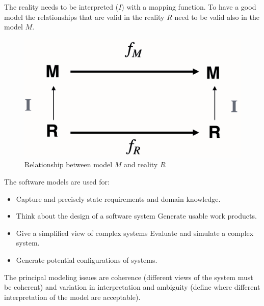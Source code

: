 \documentclass[12pt, a4paper]{report}
\newtheorem[style=M,bodystyle=\normalfont]{theorem}{Theorem}
\newtheorem[style=M,bodystyle=\normalfont]{corollary}{Corollary}
\newtheorem[style=M,bodystyle=\normalfont]{lemma}{Lemma}
\newtheorem[style=M,bodystyle=\normalfont]{definition}{Definition}
\begin{document}
    The reality needs to be interpreted ($I$) with a mapping function. To have a good model the relationships that are valid in the reality $R$ need to be valid also in the 
    model $M$.
    \begin{figure}[H]
        \centering
        \includegraphics[width=0.5\linewidth]{images/modeling.png}
        \caption{Relationship between model $M$ and reality $R$}
    \end{figure}
    The software models are used for: 
    \begin{itemize}
        \item Capture and precisely state requirements and domain knowledge.
        \item Think about the design of a software system Generate usable work products.
        \item Give a simplified view of complex systems Evaluate and simulate a complex system.
        \item Generate potential configurations of systems.
    \end{itemize}
    The principal modeling issues are coherence (different views of the system must be coherent) and variation in interpretation and ambiguity (define where different 
    interpretation of the model are acceptable).
     
\end{document}

